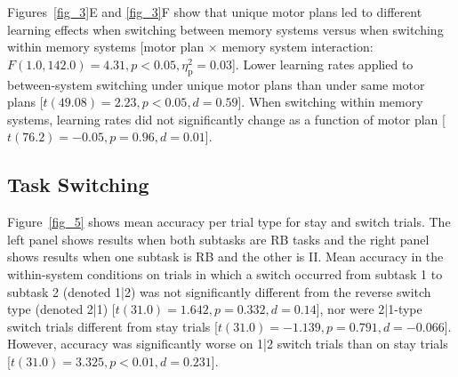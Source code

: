 \documentclass[doc, floatsintext]{apa7}
\begin{document}


Figures~\ref{fig_3}E and \ref{fig_3}F show that unique motor
plans led to different learning effects when switching
between memory systems versus when switching within memory
systems [motor plan $\times$ memory system interaction:
$F(1.0, 142.0) = 4.31, p < 0.05, \eta_{\text{p}}^{2} =
0.03$]. Lower learning rates applied to between-system
switching under unique motor plans than under same motor
plans [$t(49.08) = 2.23, p < 0.05, d = 0.59$]. When
switching within memory systems, learning rates did not
significantly change as a function of motor plan [$t(76.2) =
-0.05, p = 0.96, d = 0.01$].

\subsection{Task Switching}
Figure~\ref{fig_5} shows mean accuracy per trial type for
stay and switch trials. The left panel shows results when
both subtasks are RB tasks and the right panel shows results
when one subtask is RB and the other is II. Mean accuracy in
the within-system conditions on trials in which a switch
occurred from subtask 1 to subtask 2 (denoted 1|2) was not
significantly different from the reverse switch type
(denoted 2|1) [$t(31.0) = 1.642, p = 0.332, d = 0.14$], nor
were 2|1-type switch trials different from stay trials
[$t(31.0) = -1.139, p = 0.791, d = -0.066$]. However,
accuracy was significantly worse on 1|2 switch trials than
on stay trials [$t(31.0) = 3.325, p < 0.01, d = 0.231$].
\end{document}
